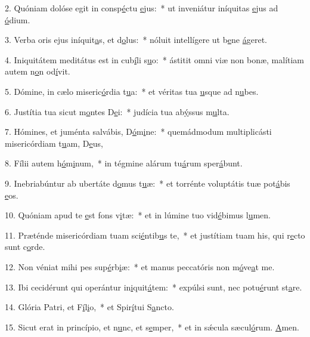 2. Quóniam dolóse egit in consp\uline{é}ctu \uline{e}jus:~* ut inveniátur iníquitas \uline{e}jus ad \uline{ó}dium.\par 
3. Verba oris ejus iníquit\uline{a}s, et d\uline{o}lus:~* nóluit intellígere ut b\uline{e}ne \uline{á}geret.\par 
4. Iniquitátem meditátus est in cub\uline{í}li s\uline{u}o:~* ástitit omni viæ non bonæ, malítiam autem n\uline{o}n od\uline{í}vit.\par 
5. Dómine, in cælo miseric\uline{ó}rdia t\uline{u}a:~* et véritas tua \uline{u}sque ad n\uline{u}bes.\par 
6. Justítia tua sicut m\uline{o}ntes D\uline{e}i:~* judícia tua ab\uline{ý}ssus m\uline{u}lta.\par 
7. Hómines, et juménta salvábis, D\uline{ó}m\uline{i}ne:~* quemádmodum multiplicásti misericórdiam t\uline{u}am, D\uline{e}us,\par 
8. Fílii autem h\uline{ó}m\uline{i}num,~* in tégmine alárum tu\uline{á}rum sper\uline{á}bunt.\par 
9. Inebriabúntur ab ubertáte d\uline{o}mus t\uline{u}æ:~* et torrénte voluptátis tuæ pot\uline{á}bis \uline{e}os.\par 
10. Quóniam apud te \uline{e}st fons v\uline{i}tæ:~* et in lúmine tuo vid\uline{é}bimus l\uline{u}men.\par 
11. Præténde misericórdiam tuam sci\uline{é}ntib\uline{u}s te,~* et justítiam tuam his, qui r\uline{e}cto sunt c\uline{o}rde.\par 
12. Non véniat mihi pes sup\uline{é}rb\uline{i}æ:~* et manus peccatóris non m\uline{ó}ve\uline{a}t me.\par 
13. Ibi cecidérunt qui operántur in\uline{i}quit\uline{á}tem:~* expúlsi sunt, nec potu\uline{é}runt st\uline{a}re.\par 
14. Glória Patri, et F\uline{í}l\uline{i}o,~* et Spir\uline{í}tui S\uline{a}ncto.\par 
15. Sicut erat in princípio, et n\uline{u}nc, et s\uline{e}mper,~* et in sǽcula sæcul\uline{ó}rum. \uline{A}men.\par 
